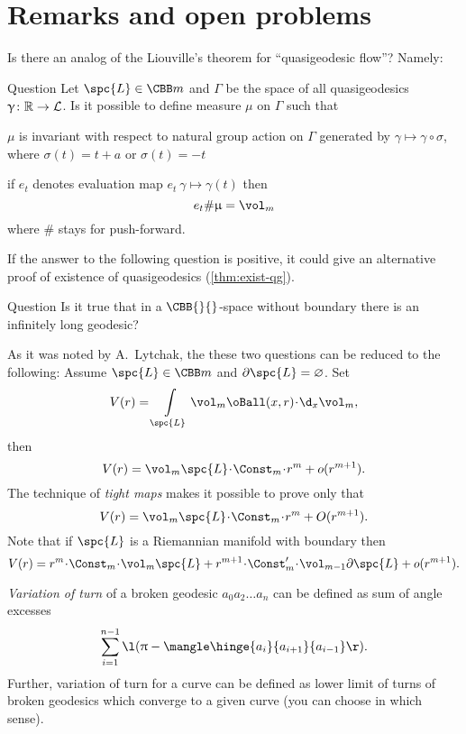 \section{Remarks and open problems}
Is there an analog of the Liouville's theorem for ``quasigeodesic flow''?
Namely:
\begin{thm}{Question}
Let $\spc{L}\in\CBB m{}$ 
and $\Gamma$ be the space of all quasigeodesics $\gamma\:\RR\to \spc{L}$.
Is it possible to define measure $\mu$ on $\Gamma$ such that 
\begin{subthm}{}
$\mu$ is invariant with respect to natural group action on $\Gamma$ generated by $\gamma\mapsto\gamma\circ\sigma$, where $\sigma(t)=t+a$ or $\sigma(t)=-t$
\end{subthm}

\begin{subthm}{}
if $e_t$ denotes evaluation map $e_t\:\gamma\mapsto\gamma(t)$ then 
\[e_t\#\mu=\vol_m\]
where $\#$ stays for push-forward.
\end{subthm}
\end{thm}

If the answer to the following question is positive, it could give an alternative proof of existence of quasigeodesics (\ref{thm:exist-qg}).

\begin{thm}{Question}
Is it true that in a $\CBB{}{}$-space without boundary there is an infinitely long geodesic?
\end{thm}


As it was noted by A.~Lytchak, the these two questions can be reduced to the following:
Assume $\spc{L}\in\CBB m{}$ and $\partial \spc{L}=\emptyset$. 
Set
\[V(r)=\int\limits_\spc{L}\vol_m\oBall(x,r)\cdot\d_x\vol_m,\]
then \[V(r)=\vol_m\spc{L}\cdot\Const_m\cdot r^m+o(r^{m+1}).\]
The technique of \emph{tight maps} makes it possible to prove only that
\[V(r)=\vol_m\spc{L}\cdot\Const_m\cdot r^m+O(r^{m+1}).\]
Note that if $\spc{L}$ is a Riemannian manifold with boundary then 
\[V(r)
=
r^m\cdot\Const_m\cdot\vol_m \spc{L} +r^{m+1}\cdot\Const'_m\cdot\vol_{m-1}\partial \spc{L}
+o(r^{m+1}).\]

\smallskip

\emph{Variation of turn} of a broken geodesic $a_0 a_2\dots a_n$ can be defined as sum of angle excesses
\[\sum_{i=1}^{n-1}\l(\pi-\mangle\hinge{a_i}{a_{i+1}}{a_{i-1}}\r).\]
Further, variation of turn for a curve can be defined as lower limit of turns of broken geodesics which converge to a given curve (you can choose in which sense).

